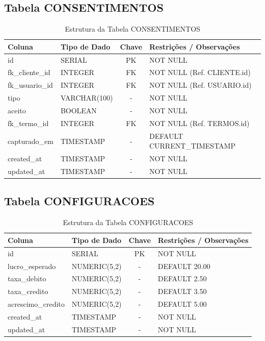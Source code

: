 \documentclass[
	12pt,				%
	openany,			%
	oneside,			%
	a4paper,			%
	english,			%
	french,				%
	spanish,			%
	brazil				%
	]{abntex2}
\begin{document}
\begin{apendicesenv}
\subsection{Tabela CONSENTIMENTOS}
\begin{table}[H]
\centering
\caption{Estrutura da Tabela CONSENTIMENTOS}
\begin{tabular}{|l|p{4cm}|c|p{6cm}|}
\hline
\textbf{Coluna} & \textbf{Tipo de Dado} & \textbf{Chave} & \textbf{Restrições / Observações} \\ \hline
id & SERIAL & PK & NOT NULL \\ \hline
fk\_cliente\_id & INTEGER & FK & NOT NULL (Ref. CLIENTE.id) \\ \hline
fk\_usuario\_id & INTEGER & FK & NOT NULL (Ref. USUARIO.id) \\ \hline
tipo & VARCHAR(100) & - & NOT NULL \\ \hline
aceito & BOOLEAN & - & NOT NULL \\ \hline
fk\_termo\_id & INTEGER & FK & NOT NULL (Ref. TERMOS.id) \\ \hline
capturado\_em & TIMESTAMP & - & DEFAULT CURRENT\_TIMESTAMP \\ \hline
created\_at & TIMESTAMP & - & NOT NULL \\ \hline
updated\_at & TIMESTAMP & - & NOT NULL \\ \hline
\end{tabular}
\end{table}

\subsection{Tabela CONFIGURACOES}
\begin{table}[H]
\centering
\caption{Estrutura da Tabela CONFIGURACOES}
\begin{tabular}{|l|p{4cm}|c|p{6cm}|}
\hline
\textbf{Coluna} & \textbf{Tipo de Dado} & \textbf{Chave} & \textbf{Restrições / Observações} \\ \hline
id & SERIAL & PK & NOT NULL \\ \hline
lucro\_esperado & NUMERIC(5,2) & - & DEFAULT 20.00 \\ \hline
taxa\_debito & NUMERIC(5,2) & - & DEFAULT 2.50 \\ \hline
taxa\_credito & NUMERIC(5,2) & - & DEFAULT 3.50 \\ \hline
acrescimo\_credito & NUMERIC(5,2) & - & DEFAULT 5.00 \\ \hline
created\_at & TIMESTAMP & - & NOT NULL \\ \hline
updated\_at & TIMESTAMP & - & NOT NULL \\ \hline
\end{tabular}
\end{table}

\end{apendicesenv}
\end{document}
